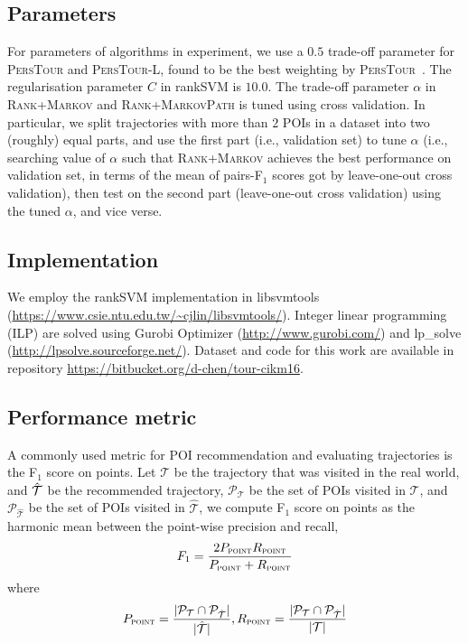 \subsection{Parameters}
For parameters of algorithms in experiment,
we use a $0.5$ trade-off parameter for \textsc{PersTour} and \textsc{PersTour-L}, found to be the best weighting by \textsc{PersTour}~\cite{ijcai15}.
The regularisation parameter $C$ in rankSVM is $10.0$.
The trade-off parameter $\alpha$ in \textsc{Rank+Markov} and \textsc{Rank+MarkovPath} is tuned using cross validation.
In particular, we split trajectories with more than $2$ POIs in a dataset into two (roughly) equal parts, 
and use the first part (i.e., validation set) to tune $\alpha$ (i.e., searching value of $\alpha$ such that \textsc{Rank+Markov} achieves the best performance on validation set, in terms of the mean of pairs-F$_1$ scores got by leave-one-out cross validation),
then test on the second part (leave-one-out cross validation) using the tuned $\alpha$, and vice verse. 

\subsection{Implementation}
We employ the rankSVM implementation in libsvmtools (\url{https://www.csie.ntu.edu.tw/~cjlin/libsvmtools/}).
Integer linear programming (ILP) are solved using Gurobi Optimizer (\url{http://www.gurobi.com/})
and lp\_solve (\url{http://lpsolve.sourceforge.net/}).
Dataset and code for this work are available in repository \url{https://bitbucket.org/d-chen/tour-cikm16}.

\subsection{Performance metric}
A commonly used metric for POI recommendation and evaluating trajectories is
the F$_1$ score on points.
Let $\mathcal{T}$ be the trajectory that was visited in the real world,
and $\hat{\cal T}$ be the recommended trajectory,
$\mathcal{P}_{\mathcal{T}}$ be the set of POIs visited in $\mathcal{T}$,
and $\mathcal{P}_{\hat{\mathcal{T}}}$ be the set of POIs visited in $\hat{\mathcal{T}}$,
we compute F$_1$ score on points as the harmonic mean between the point-wise precision and recall,
\begin{displaymath}
F_1= \frac{2  P_{\textsc{point}}  R_{\textsc{point}}}
          {P_{\textsc{point}} + R_{\textsc{point}}}
\end{displaymath}
where
\vspace{-1.1em}
\begin{displaymath}%
P_{\textsc{point}} = \frac{|\mathcal{P}_{\mathcal{T}} \cap \mathcal{P}_{\hat{\mathcal{T}}}|}
                          {|\hat{\mathcal{T}}|},
R_{\textsc{point}} = \frac{|\mathcal{P}_{\mathcal{T}} \cap \mathcal{P}_{\hat{\mathcal{T}}}|}
                          {|\mathcal{T}|}
\end{displaymath}

